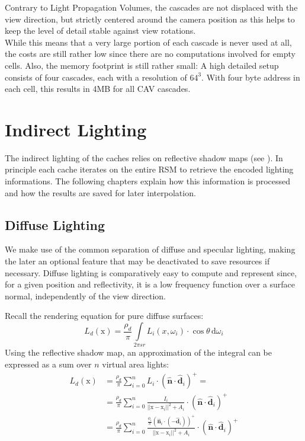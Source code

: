 \documentclass[thesis.tex]{subfiles}
\begin{document}
Contrary to Light Propagation Volumes, the cascades are not displaced with the view direction, but strictly centered around the camera position as this helps to keep the level of detail stable against view rotations.\\
While this means that a very large portion of each cascade is never used at all, the costs are still rather low since there are no computations involved for empty cells.
Also, the memory footprint is still rather small: %
A high detailed setup consists of four cascades, each with a resolution of $64^3$.
With four byte address in each cell, this results in 4MB for all CAV cascades.

\section{Indirect Lighting}
The indirect lighting of the caches relies on reflective shadow maps (see ).
In principle each cache iterates on the entire RSM to retrieve the encoded lighting informations.
The following chapters explain how this information is processed and how the results are saved for later interpolation.

\subsection{Diffuse Lighting} \label{sec:impl:diffuse}
We make use of the common separation of diffuse and specular lighting, making the later an optional feature that may be deactivated to save resources if necessary. 
Diffuse lighting is comparatively easy to compute and represent since, for a given position and reflectivity, it is a low frequency function over a surface normal, independently of the view direction.

Recall the rendering equation for pure diffuse surfaces:
\begin{equation}
L_d (\mathrm{x}) = \frac{\rho_d}{\pi}\int\limits_{2\pi sr} L_i(x,\omega_i) \cdot \cos\theta \,\mathrm{d}\omega_i
\end{equation}
Using the reflective shadow map, an approximation of the integral can be expressed as a sum over $n$ virtual area lights:
\begin{align}
L_d (\mathrm{x})
&=\frac{\rho_d}{\pi}\sum\limits_{i=0}^{n} L_i \cdot (\hat{\mathbf{n}} \cdot \hat{\mathbf{d}}_i)^+ = \\
&=\frac{\rho_d}{\pi}\sum\limits_{i=0}^{n} \frac{I_i }{||\mathrm{x} - \mathrm{x}_i||^2 +  A_i} \cdot (\hat{\mathbf{n}} \cdot \hat{\mathbf{d}}_i)^+ \\
&=\frac{\rho_d}{\pi}\sum\limits_{i=0}^{n} \frac{\frac{\phi_i}{\pi} (\hat{\mathbf{n}}_i \cdot (-\hat{\mathbf{d}}_i) )^+}{||\mathrm{x} - \mathrm{x}_i||^2 +  A_i} \cdot (\hat{\mathbf{n}} \cdot \hat{\mathbf{d}}_i)^+
\end{align}
\end{document}
